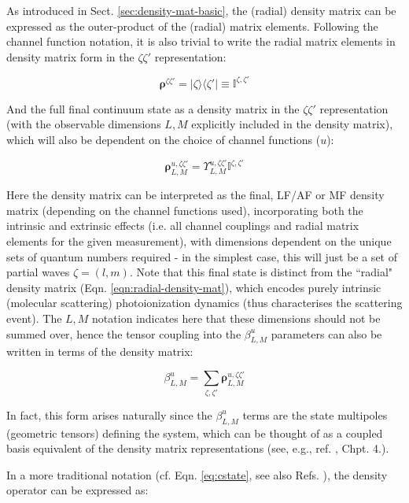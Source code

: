 \documentclass[10pt]{article}
\begin{document}
As introduced in Sect. \ref{sec:density-mat-basic}, the (radial) density matrix can be expressed as the outer-product of the (radial) matrix elements. Following the channel function notation, it is also trivial to write the radial matrix elements in density matrix form in the $\zeta\zeta'$ representation:

\begin{equation}
\mathbf{\rho}^{\zeta\zeta'} = |\zeta\rangle\langle\zeta'| \equiv \mathbb{I}^{\zeta,\zeta'}
\end{equation}

And the full final continuum state as a density matrix in the $\zeta\zeta'$ representation (with the observable dimensions $L,M$ explicitly included in the density matrix), which will also be dependent on the choice of channel functions ($u$):

\begin{equation}
\mathbf{\rho}_{L,M}^{u,\zeta\zeta'}=\varUpsilon_{L,M}^{u,\zeta\zeta'}\mathbb{I}^{\zeta,\zeta'}
\end{equation}

Here the density matrix can be interpreted as the final, LF/AF or
MF density matrix (depending on the channel functions used), incorporating both the intrinsic and extrinsic
effects (i.e. all channel couplings and radial matrix elements for
the given measurement), with dimensions dependent on the unique sets of quantum numbers required - in the simplest case, this will just be a set of partial waves $\zeta = (l,m)$. Note that this final state is distinct from the ``radial" density matrix (Eqn. \ref{eqn:radial-density-mat}), which encodes purely intrinsic (molecular scattering) photoionization dynamics (thus characterises the scattering event). The $L,M$ notation indicates here that these dimensions should not be summed over, hence the tensor coupling into the $\beta_{L,M}^{u}$ parameters can also be written in terms of the density matrix:

\begin{equation}
\beta_{L,M}^{u}=\sum_{\zeta,\zeta'}\mathbf{\rho}_{L,M}^{u,\zeta\zeta'}
\end{equation}

In fact, this form arises naturally since the $\beta_{L,M}^{u}$ terms are the state multipoles (geometric tensors) defining the system, which can be thought of as a coupled basis equivalent of the density matrix representations (see, e.g., ref. \cite{BlumDensityMat}, Chpt. 4.).

In a more traditional notation (cf. Eqn. \ref{eq:cstate}, see also Refs. \cite{gregory2021MolecularFramePhotoelectron} 
), the density operator can be expressed as:
\end{document}
